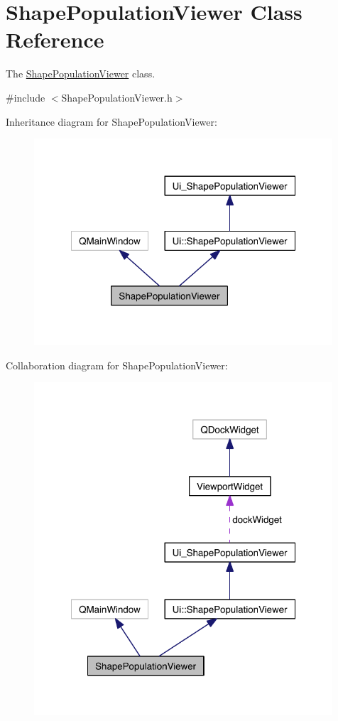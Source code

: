 \hypertarget{class_shape_population_viewer}{\section{Shape\-Population\-Viewer Class Reference}
\label{class_shape_population_viewer}
}


The \hyperlink{class_shape_population_viewer}{Shape\-Population\-Viewer} class.  




{\ttfamily \#include $<$Shape\-Population\-Viewer.\-h$>$}



Inheritance diagram for Shape\-Population\-Viewer\-:\nopagebreak
\begin{figure}[H]
\begin{center}
\leavevmode
\includegraphics[width=315pt]{class_shape_population_viewer__inherit__graph}
\end{center}
\end{figure}


Collaboration diagram for Shape\-Population\-Viewer\-:\nopagebreak
\begin{figure}[H]
\begin{center}
\leavevmode
\includegraphics[width=315pt]{class_shape_population_viewer__coll__graph}
\end{center}
\end{figure}
